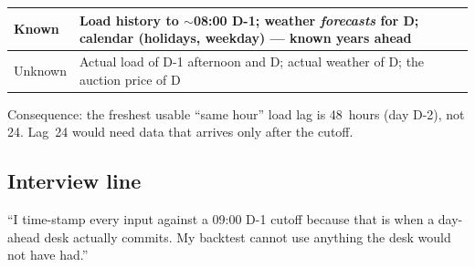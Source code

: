 \begin{center}
\begin{tabular}{lp{7cm}}
\toprule
Known & Load history to $\sim$08:00 D-1; weather \emph{forecasts} for D;
        calendar (holidays, weekday) --- known years ahead \\
\midrule
Unknown & Actual load of D-1 afternoon and D; actual weather of D;
          the auction price of D \\
\bottomrule
\end{tabular}
\end{center}

Consequence: the freshest usable ``same hour'' load lag is 48~hours
(day D-2), not 24. Lag~24 would need data that arrives only after the cutoff.

\subsection{Interview line}

``I time-stamp every input against a 09:00 D-1 cutoff because that is when a
day-ahead desk actually commits. My backtest cannot use anything the desk
would not have had.''
